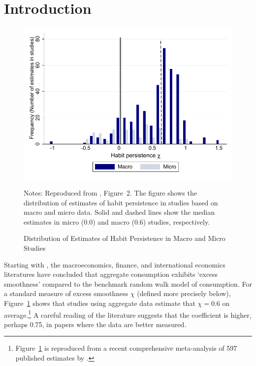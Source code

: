 \documentclass[titlepage]{./econtex}
\begin{document}


\hypertarget{Introduction}{}
\section{Introduction}\label{sec:introduction}


\begin{figure}
  \centering
\caption{Distribution of Estimates of Habit Persistence in Macro and Micro Studies}
\label{microMacroMetaHistogram}
\hypertarget{microMacroMetaHistogram}{}
    { \includegraphics[width=1.0\textwidth]{./Figures/microMacroMetaHistogram}}

    \begin{flushleft}
      \footnotesize Notes: Reproduced from \cite{hrsHabit}, Figure~2. The figure shows the distribution of estimates of habit persistence in studies based on macro and micro data. Solid and dashed lines show the median estimates in micro (0.0) and macro (0.6) studies, respectively.
      \end{flushleft}
\end{figure}

Starting with \cite{cdSmooth}, the macroeconomics, finance, and international economics literatures have concluded that aggregate consumption exhibits `excess smoothness' compared to the benchmark \cite{hallRandomWalk} random walk model of consumption. For a standard measure of excess smoothness $\chi$ (defined more precisely below), Figure~\ref{microMacroMetaHistogram} shows that studies using aggregate data estimate that $\chi=0.6$ on average.\footnote{Figure~\ref{microMacroMetaHistogram} is reproduced from a recent comprehensive meta-analysis of 597 published estimates by \cite{hrsHabit}.} A careful reading of the literature suggests that the coefficient is higher, perhaps 0.75, in papers where the data are better measured.
\end{document}
